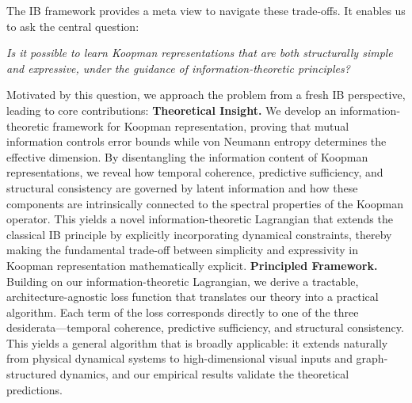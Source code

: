 \documentclass{article} %
\begin{document}
The IB framework provides a meta view to navigate these trade-offs. It enables us to ask the central question:
\begin{center}
\textit{Is it possible to learn Koopman representations that are both structurally simple and expressive, under the guidance of information-theoretic principles?}
\end{center}
Motivated by this question, we approach the problem from a fresh IB perspective, leading to core contributions: \textbf{Theoretical Insight.} We develop an information-theoretic framework for Koopman representation, proving that mutual information controls error bounds while von Neumann entropy determines the effective dimension. By disentangling the information content of Koopman representations, we reveal how temporal coherence, predictive sufficiency, and structural consistency are governed by latent information and how these components are intrinsically connected to the spectral properties of the Koopman operator. This yields a novel information-theoretic Lagrangian that extends the classical IB principle by explicitly incorporating dynamical constraints, thereby making the fundamental trade-off between simplicity and expressivity in Koopman representation mathematically explicit. 
\textbf{Principled Framework.} Building on our information-theoretic Lagrangian, we derive a tractable, architecture-agnostic loss function that translates our theory into a practical algorithm. Each term of the loss corresponds directly to one of the three desiderata—temporal coherence, predictive sufficiency, and structural consistency. This yields a general algorithm that is broadly applicable: it extends naturally from physical dynamical systems to high-dimensional visual inputs and graph-structured dynamics, and our empirical results validate the theoretical predictions. 
 
\end{document}
